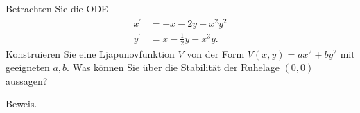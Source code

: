 \begin{exercise}
Betrachten Sie die ODE
\begin{align*}
  x^{\prime} &= -x -2y + x^2y^2 \\
  y^{\prime} &= x - \frac{1}{2}y - x^3y.
\end{align*}
Konstruieren Sie eine Ljapunovfunktion $V$ von der Form $V(x,y) = ax^2 + by^2$
mit geeigneten $a,b$. Was können Sie über die Stabilität der Ruhelage $(0,0)$
aussagen?
\end{exercise}
\begin{solution}
Beweis.
\end{solution}
